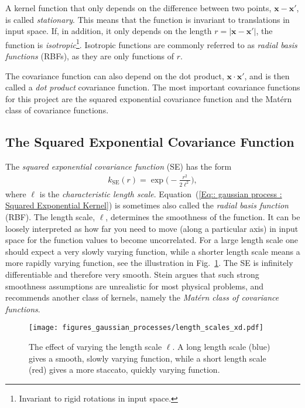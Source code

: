 \documentclass[twoside,english]{uiofysmaster}
\begin{document}
A kernel function that only depends on the difference between two points, $\textbf{x}-\textbf{x}'$, is called \textit{stationary}. This means that the function is invariant to translations in input space. If, in addition, it only depends on the length $r=|\textbf{x}-\textbf{x}'|$, the function is \textit{isotropic}\footnote{Invariant to rigid rotations in input space.}.  Isotropic functions are commonly referred to as \textit{radial basis functions} (RBFs), as they are only functions of $r$. 

The covariance function can also depend on the dot product, $\textbf{x} \cdot \textbf{x}'$, and is then called a \textit{dot product} covariance function. The most important covariance functions for this project are the squared exponential covariance function and the Mat\'{e}rn class of covariance functions.




\subsection{The Squared Exponential Covariance Function}

The \textit{squared exponential covariance function} (SE) has the form 
\begin{align}\label{Eq:: gaussian process : Squared Exponential Kernel}
k_{\mathrm{SE}} (r) = \exp \Big( - \frac{r^2}{2 \ell^2} \Big),
\end{align} 
where $\ell$ is the \textit{characteristic length scale}. Equation~(\ref{Eq:: gaussian process : Squared Exponential Kernel}) is sometimes also called the \textit{radial basis function} (RBF). The length scale, $\ell$, determines the smoothness of the function. It can be loosely interpreted as how far you need to move (along a particular axis) in input space for the function values to become uncorrelated. For a large length scale one should expect a very slowly varying function, while a shorter length scale means a more rapidly varying function, see the illustration in Fig.~\ref{Fig:: gaussian process : ell variation example}. The SE is infinitely differentiable and therefore very smooth. Stein \cite{steininterpolation} argues that such strong smoothness assumptions are unrealistic for most physical problems, and recommends another class of kernels, namely the \textit{Mat\'{e}rn class of covariance functions}.

\begin{figure}
\centering
\texttt{[image: figures\_gaussian\_processes/length\_scales\_xd.pdf]}
\caption{The effect of varying the length scale $\ell$. A long length scale (blue) gives a smooth, slowly varying function, while a short length scale (red) gives a more staccato, quickly varying function.}
\label{Fig:: gaussian process : ell variation example}
\end{figure}
\end{document}
